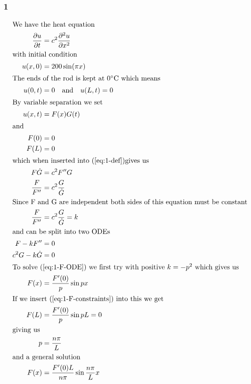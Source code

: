 \documentclass[a4paper]{article}
\newcommand{\ex}[1]{\subsubsection*{#1}}
\begin{document}
\pagestyle{fancy} %



\ex{1}

\begin{align}
    \intertext{We have the heat equation}
    \frac{\partial u}{\partial t} &= c^2 \frac{\partial^2 u}{\partial x^2}
        \label{eq:1-def} \\
    \intertext{with initial condition}
    u(x,0) &= 200 \sin(\pi x) \label{eq:1-init} \\
    \intertext{The ends of the rod is kept at 0\degree C which means}
    u(0,t) &= 0 \quad\text{and}\quad u(L,t) = 0 \label{eq:1-constraints}\\
    \intertext{By variable separation we set}
    u(x,t) &= F(x)G(t) \label{eq:1-separated}\\
    \intertext{and}
    F(0) &= 0 \label{eq:1-F-constraints}\\ 
    F(L) &= 0 \label{eq:1-G-constraints}\\
    \intertext{which when inserted into (\ref{eq:1-def})gives us}
    F\dot G &= c^2 F''G \\
    \frac{F}{F''} &= c^2\frac{G}{\dot G} \\
    \intertext{Since F and G are independent both sides of this equation must
        be constant}
    \frac{F}{F''} &= c^2\frac{G}{\dot G} = k \\
    \intertext{and can be split into two ODEs}
    F -kF'' &= 0 \label{eq:1-F-ODE}\\
    c^2G - k\dot G &= 0 \label{eq:1-G-ODE}\\
    \intertext{To solve (\ref{eq:1-F-ODE}) we first try with positive \(k =
        -p^2\) which gives us}
    F(x) &= \frac{F'(0)}{p} \sin px \\
    \intertext{If we insert (\ref{eq:1-F-constraints}) into this we get}
    F(L) &= \frac{F'(0)}{p} \sin pL = 0 \\
    \intertext{giving us}
    p &= \frac{n\pi}{L} \\
    \intertext{and a general solution}
    F(x) &= \frac{F'(0)L}{n\pi}\sin \frac{n\pi}{L}x \\
\end{align}
\end{document}
